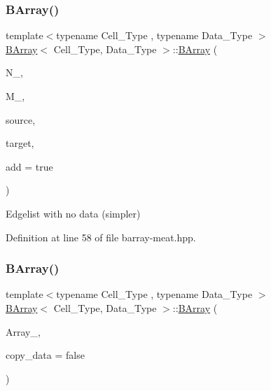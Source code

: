 \subsubsection{\texorpdfstring{B\+Array()}{BArray()}\hspace{0.1cm}{\footnotesize\ttfamily [4/5]}}
{\footnotesize\ttfamily template$<$typename Cell\+\_\+\+Type , typename Data\+\_\+\+Type $>$ \\
\hyperlink{class_b_array}{B\+Array}$<$ Cell\+\_\+\+Type, Data\+\_\+\+Type $>$\+::\hyperlink{class_b_array}{B\+Array} (\begin{DoxyParamCaption}\item[{\hyperlink{typedefs_8hpp_a91ad9478d81a7aaf2593e8d9c3d06a14}{uint}}]{N\+\_\+,  }\item[{\hyperlink{typedefs_8hpp_a91ad9478d81a7aaf2593e8d9c3d06a14}{uint}}]{M\+\_\+,  }\item[{const std\+::vector$<$ \hyperlink{typedefs_8hpp_a91ad9478d81a7aaf2593e8d9c3d06a14}{uint} $>$ \&}]{source,  }\item[{const std\+::vector$<$ \hyperlink{typedefs_8hpp_a91ad9478d81a7aaf2593e8d9c3d06a14}{uint} $>$ \&}]{target,  }\item[{bool}]{add = {\ttfamily true} }\end{DoxyParamCaption})\hspace{0.3cm}{\ttfamily [inline]}}



Edgelist with no data (simpler) 



Definition at line 58 of file barray-\/meat.\+hpp.

\mbox{\label{class_b_array_a1e4a2a12c3a57e462ee4d65d7842a1c7}} 
\subsubsection{\texorpdfstring{B\+Array()}{BArray()}\hspace{0.1cm}{\footnotesize\ttfamily [5/5]}}
{\footnotesize\ttfamily template$<$typename Cell\+\_\+\+Type , typename Data\+\_\+\+Type $>$ \\
\hyperlink{class_b_array}{B\+Array}$<$ Cell\+\_\+\+Type, Data\+\_\+\+Type $>$\+::\hyperlink{class_b_array}{B\+Array} (\begin{DoxyParamCaption}\item[{const \hyperlink{class_b_array}{B\+Array}$<$ Cell\+\_\+\+Type, Data\+\_\+\+Type $>$ \&}]{Array\+\_\+,  }\item[{bool}]{copy\+\_\+data = {\ttfamily false} }\end{DoxyParamCaption})\hspace{0.3cm}{\ttfamily [inline]}}



